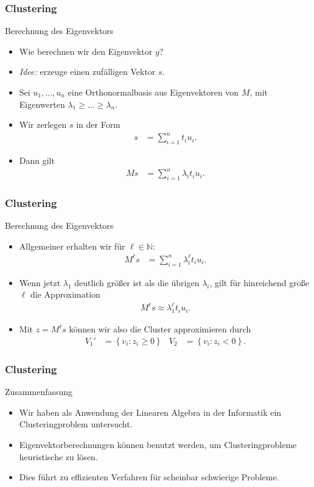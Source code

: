\documentclass{beamer}
\renewcommand{\emph}[1]{{\textcolor{solarizedRed}{\itshape #1}}}
\newcommand\NN{\mathbb N}
\newcommand\cbc[1]{\left\{{#1}\right\}}
\renewcommand{\ae}{\"a}
\renewcommand{\oe}{\"o}
\newcommand{\ue}{\"u}
\newcommand{\mytitle}{Clustering}
\begin{document}
\begin{frame}\frametitle{\mytitle}
	\begin{block}{Berechnung des Eigenvektors}
		\begin{itemize}
			\item Wie berechnen wir den Eigenvektor $y$?
			\item \emph{Idee:} erzeuge einen zuf\ae lligen Vektor $s$.
			\item Sei $u_1,\ldots,u_n$ eine Orthonormalbasis aus Eigenvektoren von $M$, mit Eigenwerten $\lambda_1\geq\ldots\geq\lambda_n$.
			\item Wir zerlegen $s$ in der Form
				\begin{align*}
					s&=\sum_{i=1}^n t_iu_i.
				\end{align*}
			\item Dann gilt
				\begin{align*}
					Ms&=\sum_{i=1}^n\lambda_it_iu_i.
				\end{align*}
		\end{itemize}
	\end{block}
\end{frame}

\begin{frame}\frametitle{\mytitle}
	\begin{block}{Berechnung des Eigenvektors}
		\begin{itemize}
			\item Allgemeiner erhalten wir f\ue r $\ell\in\NN$:
				\begin{align*}
					M^\ell s&=\sum_{i=1}^n\lambda_i^\ell t_iu_i.
				\end{align*}
			\item Wenn jetzt $\lambda_1$ deutlich gr\oe\ss er ist als die \ue brigen $\lambda_i$, gilt f\ue r hinreichend gro\ss e $\ell$ die Approximation
				\begin{align*}
				M^\ell s\approx\lambda_1^\ell t_i u_i.
				\end{align*}
			\item Mit $z=M^\ell s$ k\oe nnen wir also die Cluster approximieren durch
\begin{align*}
					V_1'&=\cbc{v_i:z_i\geq0}&V_2&=\cbc{v_i:z_i<0}.
				\end{align*}
		\end{itemize}
	\end{block}
\end{frame}

\begin{frame}\frametitle{\mytitle}
	\begin{block}{Zusammenfassung}
		\begin{itemize}
			\item Wir haben als Anwendung der Linearen Algebra in der Informatik ein Clusteringproblem untersucht.
			\item Eigenvektorberechnungen k\oe nnen benutzt werden, um Clusteringprobleme heuristische zu l\oe sen.
			\item Dies f\ue hrt zu effizienten Verfahren f\ue r scheinbar schwierige Probleme.
		\end{itemize}
	\end{block}
\end{frame}
\end{document}
